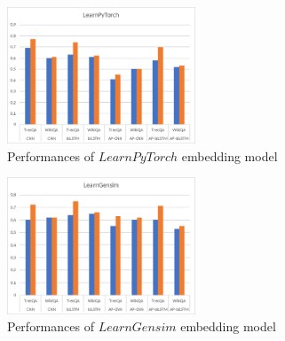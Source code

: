 \documentclass[11pt,a4paper]{article}
\begin{document}
\begin{figure}[ht]
    \centering
    \includegraphics[width=0.5\textwidth]{learnpytorch.eps}
    \caption{Performances of $LearnPyTorch$ embedding model}
    \label{picture:learnpytorch}
\end{figure}
\begin{figure}[ht]
    \centering
    \includegraphics[width=0.5\textwidth]{learngensim.eps}
    \caption{Performances of $LearnGensim$ embedding model}
    \label{picture:learngensim}
\end{figure}

\clearpage



\end{document}
